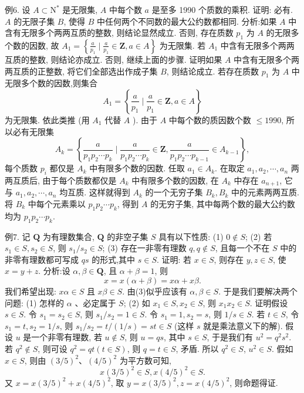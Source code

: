 例6. 设 $A \subset \mathrm{N}^*$ 是无限集, $A$ 中每个数 $a$ 是至多 1990 个质数的乘积.
证明: 必有.
$A$ 的无限子集 $B$, 使得 $B$ 中任何两个不同数的最大公约数都相同.
分析:如果 $A$ 中含有无限多个两两互质的整数, 则结论显然成立.
否则, 存在质数 $p_1$ 为 $A$ 的无限多个数的因数, 故 $A_1=\left\{\frac{a}{p_1} \mid \frac{a}{p_1} \in \mathbf{Z}, a \in A\right\}$ 为无限集.
若 $A_1$ 中含有无限多个两两互质的整数, 则结论亦成立.
否则, 继续上面的步骤.
证明如果 $A$ 中含有无限多个两两互质的正整数, 将它们全部选出作成子集 $B$, 则结论成立.
若存在质数 $p_1$ 为 $A$ 中无限多个数的因数,则集合
$$
A_1=\left\{\frac{a}{p_1} \mid \frac{a}{p_1} \in \mathbf{Z}, a \in A\right\}
$$
为无限集.
依此类推 (用 $A_1$ 代替 $A$ ). 由于 $A$ 中每个数的质因数个数 $\leqslant 1990$, 所以必有无限集
$$
A_k=\left\{\frac{a}{p_1 p_2 \cdots p_k} \mid \frac{a}{p_1 p_2 \cdots p_k} \in \mathbf{Z}, \frac{a}{p_1 p_2 \cdots p_{k-1}} \in A_{k-1}\right\},
$$
每个质数 $p_i$ 都仅是 $A_k$ 中有限多个数的因数.
任取 $a_1 \in A_k$. 在取定 $a_1, a_2, \cdots, a_n$ 两两互质后, 由于每个质数都仅是 $A_k$ 中有限多个数的因数, 在 $A_k$ 中存在 $a_{n+1}$, 它与 $a_1, a_2, \cdots, a_n$ 均互质.
这样就得到 $A_k$ 的一个无穷子集 $B_k, B_k$ 中的元素两两互质.
将 $B_k$ 中每个元素乘以 $p_1 p_2 \cdots p_k$, 得到 $A$ 的无穷子集, 其中每两个数的最大公约数均为 $p_1 p_2 \cdots p_k$.



例7. 记 $\mathbf{Q}$ 为有理数集合, $\mathbf{Q}$ 的非空子集 $S$ 具有以下性质:
(1) $0 \notin S$;
(2) 若 $s_1 \in S, s_2 \in S$, 则 $s_1 / s_2 \in S$;
(3) 存在一非零有理数 $q, q \notin S$, 且每一个不在 $S$ 中的非零有理数都可写成 $q s$ 的形式,其中 $s \in S$.
证明: 若 $x \in S$, 则存在 $y, z \in S$, 使 $x=y+z$.
分析:设 $\alpha, \beta \in \mathbf{Q}$, 且 $\alpha+\beta=1$, 则
$$
x=x(\alpha+\beta)=x \alpha+x \beta .
$$
我们希望出现: $x \alpha \in S$ 且 $x \beta \in S$. 由(3)似乎应该有 $\alpha, \beta \in S$. 于是我们要解决两个问题: (1) 怎样的 $\alpha$ 、必定属于 $S$; (2) 如 $x_1 \in S, x_2 \in S$, 则 $x_1 x_2 \in S$.
证明假设 $s \in S$. 令 $s_1=s_2 \in S$, 则 $s_1 / s_2=1 \in S$. 令 $s_1=1, s_2=s$, 则 $1 / s \in S$.
若 $t \in S$, 令 $s_1=t, s_2=1 / s$, 则 $s_1 / s_2=t /(1 / s)=s t \in S$ (这样 $s$ 就是乘法意义下的解).
假设 $u$ 是一个非零有理数, 若 $u \notin S$, 则 $u=q s$, 其中 $s \in S$, 于是我们有 $u^2=q^2 s^2$.
若 $q^2 \notin S$, 则可设 $q^2=q t(t \in S)$, 则 $q=t \in S$, 矛盾.
所以 $q^2 \in S$, $u^2 \in S$.
假如 $x \in S$, 则由 $(3 / 5)^2 、(4 / 5)^2$ 为平方数可知,
$$
x(3 / 5)^2 \in S, x(4 / 5)^2 \in S .
$$
又 $x=x(3 / 5)^2+x(4 / 5)^2$, 取 $y=x(3 / 5)^2, z=x(4 / 5)^2$, 则命题得证.



